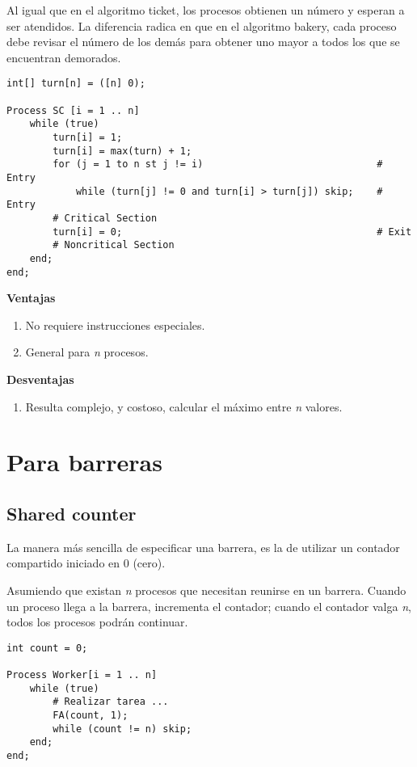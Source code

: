 \documentclass[a4paper, 11pt]{book}
\begin{document}
Al igual que en el algoritmo ticket, los procesos obtienen un número y esperan a ser atendidos. La diferencia radica en que en el algoritmo bakery, cada proceso debe revisar el número de los demás para obtener uno mayor a todos los que se encuentran demorados.

\begin{lstlisting}
int[] turn[n] = ([n] 0);

Process SC [i = 1 .. n]
    while (true)
        turn[i] = 1; 
        turn[i] = max(turn) + 1;
        for (j = 1 to n st j != i)                              # Entry
            while (turn[j] != 0 and turn[i] > turn[j]) skip;    # Entry
        # Critical Section
        turn[i] = 0;                                            # Exit
        # Noncritical Section
    end;
end;
\end{lstlisting}

\textbf{Ventajas}
\begin{enumerate}
    \item No requiere instrucciones especiales.
    \item General para \emph{n} procesos.
\end{enumerate}

\textbf{Desventajas}
\begin{enumerate}
    \item Resulta complejo, y costoso, calcular el máximo entre \emph{n} valores.
\end{enumerate}


\section{Para barreras}

\subsection{Shared counter}

La manera más sencilla de especificar una barrera, es la de utilizar un contador compartido iniciado en 0 (cero). 

Asumiendo que existan \emph{n} procesos que necesitan reunirse en un barrera. Cuando un proceso llega a la barrera, incrementa el contador; cuando el contador valga \emph{n}, todos los procesos podrán continuar.

\begin{lstlisting}
int count = 0;

Process Worker[i = 1 .. n]
    while (true)
        # Realizar tarea ...
        FA(count, 1);
        while (count != n) skip;
    end;
end;
\end{lstlisting}
\end{document}
